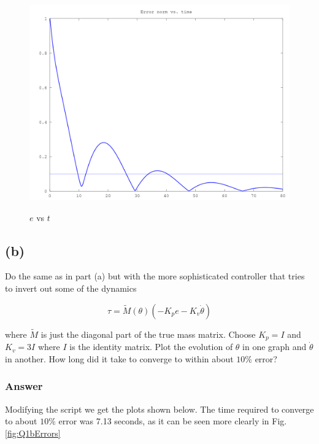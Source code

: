\documentclass[10pt,a4paper]{article}
\begin{document}
\begin{figure}[H]
  \centering
  \includegraphics[angle = 0, scale = 0.3]{figures/Question1aErrors.png} 
  \label{fig:Q1aErrors}
  \caption{$e$ vs $t$}
\end{figure}


\subsection*{(b)}
Do the same as in part (a) but with the more sophisticated controller that tries to invert out some of the dynamics

\[ \tau = \tilde{M}(\theta)\left ( -K_{p}e - K_{v}\dot{\theta} \right ) \]

where $\tilde{M}$ is just the diagonal part of the true mass matrix. Choose $K_{p} = I$ and $K_{v} = 3I$ where $I$ is the identity matrix. Plot the evolution of $\theta$ in one graph and $\dot{\theta}$ in another. How long did it take to converge to within about $10\%$ error?
\subsubsection*{Answer}
Modifying the script we get the plots shown below. The time required to converge to about $10\%$ error was 7.13 seconds, as it can be seen more clearly in Fig. \ref{fig:Q1bErrors}
\end{document}
